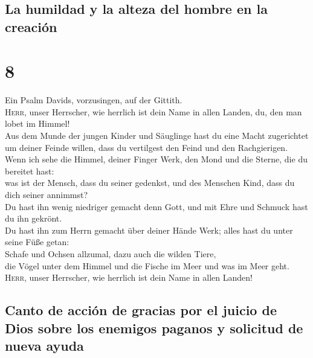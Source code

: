 \hypertarget{la-humildad-y-la-alteza-del-hombre-en-la-creaciuxf3n}{%
\subsection{La humildad y la alteza del hombre en la
creación}\label{la-humildad-y-la-alteza-del-hombre-en-la-creaciuxf3n}}

\hypertarget{section-7}{%
\section{8}\label{section-7}}

 Ein Psalm Davids, vorzusingen, auf der Gittith.\\
 \textsc{Herr}, unser Herrscher, wie herrlich ist dein
Name in allen Landen, du, den man lobet im Himmel!\\
 Aus dem Munde der jungen Kinder und Säuglinge hast du
eine Macht zugerichtet um deiner Feinde willen, dass du vertilgest den
Feind und den Rachgierigen.\\
 Wenn ich sehe die Himmel, deiner Finger Werk, den Mond
und die Sterne, die du bereitet hast:\\
 was ist der Mensch, dass du seiner gedenkst, und des
Menschen Kind, dass du dich seiner annimmst?\\
 Du hast ihn wenig niedriger gemacht denn Gott, und mit
Ehre und Schmuck hast du ihn gekrönt.\\
 Du hast ihn zum Herrn gemacht über deiner Hände Werk;
alles hast du unter seine Füße getan:\\
 Schafe und Ochsen allzumal, dazu auch die wilden Tiere,\\
 die Vögel unter dem Himmel und die Fische im Meer und was
im Meer geht.\\
 \textsc{Herr}, unser Herrscher, wie herrlich ist dein
Name in allen Landen!

\hypertarget{canto-de-acciuxf3n-de-gracias-por-el-juicio-de-dios-sobre-los-enemigos-paganos-y-solicitud-de-nueva-ayuda}{%
\subsection{Canto de acción de gracias por el juicio de Dios sobre los
enemigos paganos y solicitud de nueva
ayuda}\label{canto-de-acciuxf3n-de-gracias-por-el-juicio-de-dios-sobre-los-enemigos-paganos-y-solicitud-de-nueva-ayuda}}

